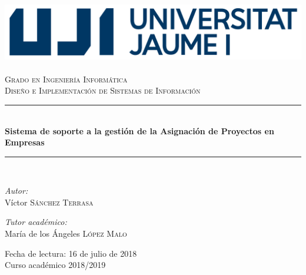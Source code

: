 \documentclass[pdftex,11pt,a4paper]{book}
\newcommand{\HRule}{\rule{\linewidth}{0.5mm}}
\begin{document}
\begin{titlepage}
\begin{center}

\includegraphics{img/marca-uji-2955.png}~\\[3.0cm]

\textsc{\LARGE Grado en Ingeniería Informática}\\[1.5cm]

\textsc{\LARGE Diseño e Implementación de Sistemas de Información}\\[1.5cm]

\HRule \\[0.4cm]
{ \huge \bfseries Sistema de soporte a la gestión de la Asignación de Proyectos en Empresas \\[0.4cm] }

\HRule \\[1.5cm]

\begin{minipage}{0.4\textwidth}
\begin{flushleft} \large
\emph{Autor:}\\
Víctor \textsc{Sánchez Terrasa}
\end{flushleft}
\end{minipage}
\begin{minipage}{0.4\textwidth}
\begin{flushright} \large
\emph{Tutor académico:} \\
María de los Ángeles \textsc{López Malo}
\end{flushright}
\end{minipage}

\vfill

{\large Fecha de lectura: 16 de julio de 2018\\
Curso académico 2018/2019}

\end{center}
\end{titlepage}
\setlength{\parskip}{\baselineskip}
\end{document}
